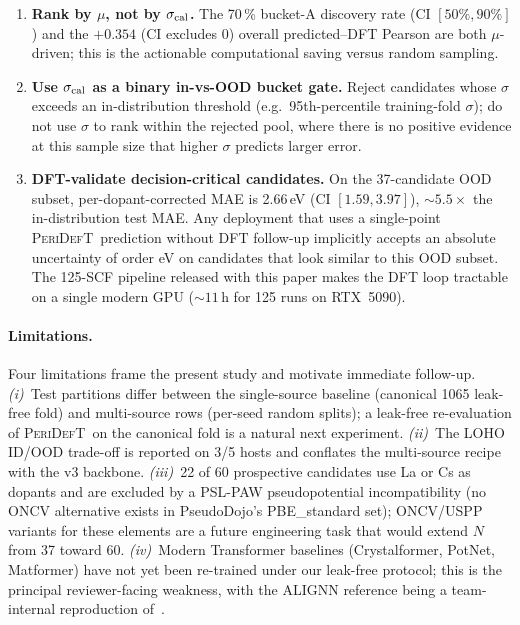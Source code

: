 \documentclass[11pt,a4paper]{article}
\newcommand{\modelname}{\textsc{PeriDefT}}
\begin{document}
\begin{enumerate}[leftmargin=20pt, itemsep=3pt]
\item \textbf{Rank by $\mu$, not by $\sigma_{\rm cal}$.} The 70\,\%
bucket-A discovery rate (CI $[50\%, 90\%]$) and the
$+0.354$ (CI excludes 0) overall predicted--DFT Pearson are both
$\mu$-driven; this is the actionable computational saving versus
random sampling.
\item \textbf{Use $\sigma_{\rm cal}$ as a binary in-vs-OOD bucket
gate.} Reject candidates whose $\sigma$ exceeds an
in-distribution threshold (e.g.\ 95th-percentile training-fold
$\sigma$); do not use $\sigma$ to rank within the rejected pool,
where there is no positive evidence at this sample size that
higher $\sigma$ predicts larger error.
\item \textbf{DFT-validate decision-critical candidates.} On the
37-candidate OOD subset, per-dopant-corrected MAE is 2.66\,eV
(CI $[1.59, 3.97]$), $\sim 5.5\times$ the in-distribution test
MAE. Any deployment that uses a single-point \modelname\
prediction without DFT follow-up implicitly accepts an absolute
uncertainty of order eV on candidates that look similar to this
OOD subset. The 125-SCF pipeline released with this paper makes
the DFT loop tractable on a single modern GPU
($\sim 11$\,h for 125 runs on RTX~5090).
\end{enumerate}

\paragraph{Limitations.}
Four limitations frame the present study and motivate immediate
follow-up. \emph{(i)}~Test partitions differ between the
single-source baseline (canonical 1065 leak-free fold) and
multi-source rows (per-seed random splits); a leak-free
re-evaluation of \modelname\ on the canonical fold is a natural
next experiment. \emph{(ii)}~The LOHO ID/OOD trade-off is reported
on 3/5 hosts and conflates the multi-source recipe with the v3
backbone. \emph{(iii)}~22 of 60 prospective candidates use La or
Cs as dopants and are excluded by a PSL-PAW pseudopotential
incompatibility (no ONCV alternative exists in PseudoDojo's
PBE\_standard set); ONCV/USPP variants for these elements are a
future engineering task that would extend $N$ from 37 toward 60.
\emph{(iv)}~Modern Transformer baselines (Crystalformer, PotNet,
Matformer) have not yet been re-trained under our leak-free
protocol; this is the principal reviewer-facing weakness, with the
ALIGNN reference being a team-internal reproduction
of~\cite{ourPaperV12}.
\end{document}
